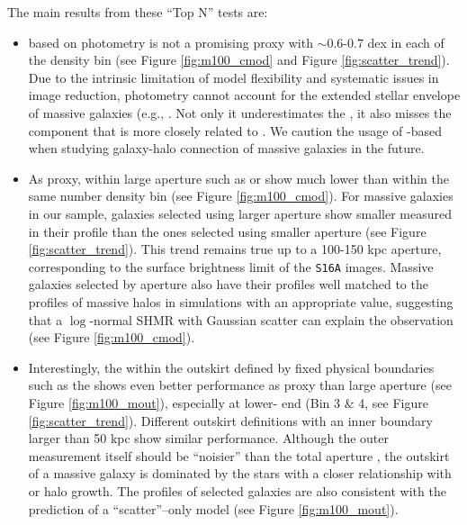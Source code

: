 \documentclass[a4paper,fleqn,usenatbib]{mnras}
\begin{document}
    The main results from these ``Top N'' tests are:

    \begin{itemize}

        \item \mstar{} based on \cmodel{} photometry is not a promising \mvir{} proxy with
            \sigmh{}$\sim 0.6$-0.7 dex in each of the density bin (see Figure \ref{fig:m100_cmod}
            and Figure \ref{fig:scatter_trend}).
            Due to the intrinsic limitation of model flexibility and systematic issues in
            image reduction, \cmodel{} photometry cannot account for the extended stellar
            envelope of massive galaxies (e.g., \citealt{Bernardi2013, Huang2018b}.
            Not only it underestimates the \mstar{}, it also misses the component that is
            more closely related to \mvir{}.
            We caution the usage of \cmodel{}-based \mstar{} when studying galaxy-halo
            connection of massive galaxies in the future.

        \item As \mvir{} proxy, \mstar{} within large aperture such as  or
             show much lower \sigmh{} than \mcmodel{} within the same number
            density bin (see Figure \ref{fig:m100_cmod}).
            For massive galaxies in our sample, galaxies selected using larger aperture \mstar{}
            show smaller \sigmh{} measured in their \dsigma{} profile than the ones
            selected using smaller aperture (see Figure \ref{fig:scatter_trend}).
            This trend remains true up to a 100-150 kpc aperture, corresponding to the
            surface brightness limit of the \texttt{S16A} images.
            Massive galaxies selected by aperture \mstar{} also have their \dsigma{}
            profiles well matched to the profiles of massive halos in simulations with an
            appropriate \sigmh{} value, suggesting that a $\log$-normal SHMR with Gaussian
            scatter can explain the observation (see Figure \ref{fig:m100_cmod}).

        \item Interestingly, the \mstar{} within the outskirt defined by fixed physical 
            boundaries such as the  shows even better performance as 
            \mvir{} proxy than large aperture \mstar{} (see Figure \ref{fig:m100_mout}),
            especially at lower-\mvir{} end (Bin 3 \& 4, see Figure \ref{fig:scatter_trend}).
            Different outskirt \mstar{} definitions with an inner boundary larger than 50 kpc
            show similar performance.
            Although the outer \mstar{} measurement itself should be ``noisier'' than the 
            total aperture \mstar{}, the outskirt of a massive galaxy is dominated by 
            the \exsitu{} stars with a closer relationship with \mvir{} or halo growth.
            The \dsigma{} profiles of  selected galaxies are also consistent 
            with the prediction of a ``scatter''--only model (see Figure \ref{fig:m100_mout}).
        

\end{itemize}
\end{document}
